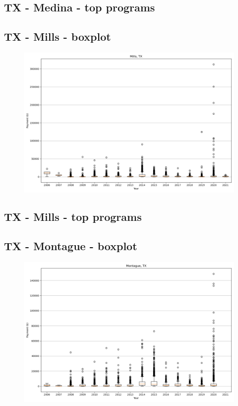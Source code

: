 \subsection*{TX - Medina - top programs}

\newpage
\subsection*{TX - Mills - boxplot}
\begin{figure}[h]
\centering
\includegraphics[width=7in]{../output/boxplots/counties/Mills-TX_boxplot.png}
\end{figure}


\subsection*{TX - Mills - top programs}

\newpage
\subsection*{TX - Montague - boxplot}
\begin{figure}[h]
\centering
\includegraphics[width=7in]{../output/boxplots/counties/Montague-TX_boxplot.png}
\end{figure}


